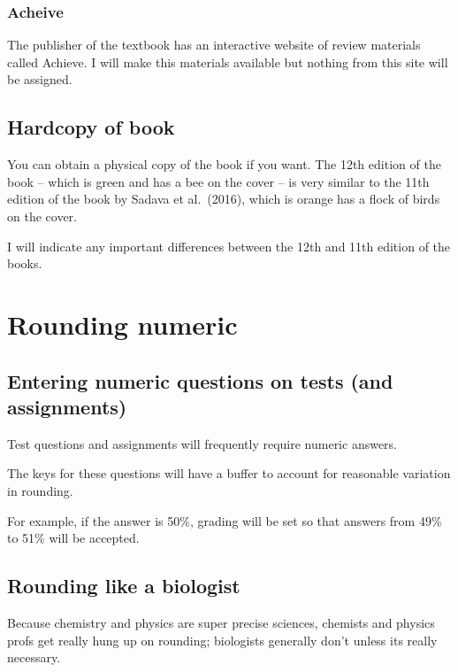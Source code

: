 \documentclass[
]{book}
\begin{document}
\hypertarget{acheive-1}{%
\subsection{Acheive}\label{acheive-1}}

The publisher of the textbook has an interactive website of review materials called Achieve. I will make this materials available but nothing from this site will be assigned.

\hypertarget{hardcopy-of-book}{%
\section{Hardcopy of book}\label{hardcopy-of-book}}

You can obtain a physical copy of the book if you want. The 12th edition of the book -- which is green and has a bee on the cover -- is very similar to the 11th edition of the book by Sadava et al.~(2016), which is orange has a flock of birds on the cover.

I will indicate any important differences between the 12th and 11th edition of the books.

\hypertarget{rounding-numeric}{%
\chapter{Rounding numeric}\label{rounding-numeric}}

\hypertarget{entering-numeric-questions-on-tests-and-assignments}{%
\section{Entering numeric questions on tests (and assignments)}\label{entering-numeric-questions-on-tests-and-assignments}}

Test questions and assignments will frequently require numeric answers.

The keys for these questions will have a buffer to account for reasonable variation in rounding.

For example, if the answer is 50\%, grading will be set so that answers from 49\% to 51\% will be accepted.

\hypertarget{rounding-like-a-biologist}{%
\section{Rounding like a biologist}\label{rounding-like-a-biologist}}

Because chemistry and physics are super precise sciences, chemists and physics profs get really hung up on rounding; biologists generally don't unless its really necessary.
\end{document}
